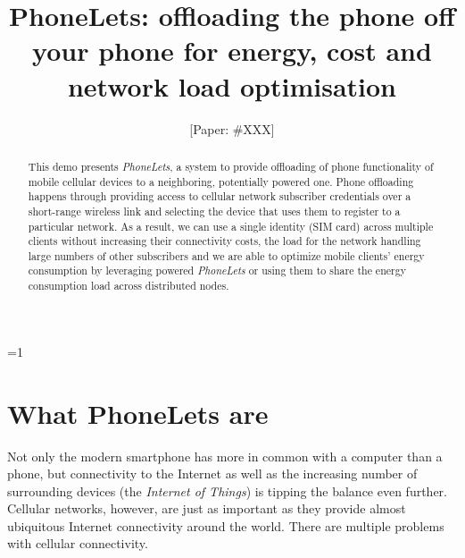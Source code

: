 \documentclass{sig-alternate-10pt}
\def\anon{0}        %
\begin{document}
\date{}


\title{PhoneLets: offloading the phone off your phone for energy, cost and network load optimisation}
\ifnum\anon=1
\author{[Paper: \#XXX]}%
\else
{}
\author{
}
\fi

    
\maketitle
\begin{abstract}
This demo presents \emph{PhoneLets}, a system to provide offloading of phone functionality of mobile cellular devices to a neighboring, potentially powered one. Phone offloading happens through providing access to cellular network subscriber credentials over a short-range wireless link and selecting the device that uses them to register to a particular network. As a result, we can use a single identity (SIM card) across multiple clients without increasing their connectivity costs, the load for the network handling large numbers of other subscribers and we are able to optimize mobile clients' energy consumption by leveraging powered \emph{PhoneLets} or using them to share the energy consumption load across distributed nodes.
\end{abstract} 

\section{What PhoneLets are}
\label{section:intro}

Not only the modern smartphone has more in common with a computer than a phone, but connectivity to the Internet as well as the increasing number of surrounding devices (the \emph{Internet of Things}) is tipping the balance even further. Cellular networks, however, are just as important as they provide almost ubiquitous Internet connectivity around the world. There are multiple problems with cellular connectivity.
\end{document}
